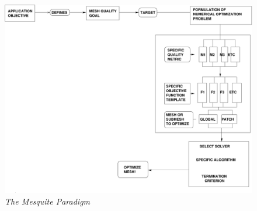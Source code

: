 
\begin{figure}[htb]
\begin{center}
\includegraphics[width=4.7in]{figures/msq-paradigm}
\caption{\em The Mesquite Paradigm \label{Paradigm} }
\end{center}
\end{figure}


